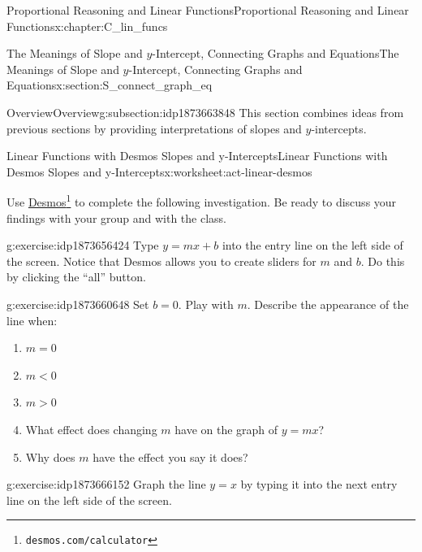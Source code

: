 \documentclass[oneside,10pt,]{book}
\numberwithin{equation}{chapter}
\newcommand{\lt}{<}
\newcommand{\gt}{>}
\begin{document}
\begin{chapterptx}{Proportional Reasoning and Linear Functions}{}{Proportional Reasoning and Linear Functions}{}{}{x:chapter:C_lin_funcs}
\begin{sectionptx}{The Meanings of Slope and \(y\)-Intercept, Connecting Graphs and Equations}{}{The Meanings of Slope and \(y\)-Intercept, Connecting Graphs and Equations}{}{}{x:section:S_connect_graph_eq}
\typeout{************************************************}
%
\begin{subsectionptx}{Overview}{}{Overview}{}{}{g:subsection:idp1873663848}
This section combines ideas from previous sections by providing interpretations of slopes and \(y\)-intercepts.%
\end{subsectionptx}
%
%
\typeout{************************************************}
\typeout{************************************************}
%
\begin{worksheet-subsection}{Linear Functions with Desmos \textemdash{} Slopes and y-Intercepts}{}{Linear Functions with Desmos \textemdash{} Slopes and y-Intercepts}{}{}{x:worksheet:act-linear-desmos}
\begin{introduction}{}%
Use \href{https://www.desmos.com/calculator}{Desmos}\footnote{\nolinkurl{desmos.com/calculator}\label{g:fn:idp1873656296}} to complete the following investigation. Be ready to discuss your findings with your group and with the class.%
\end{introduction}%
\begin{divisionexercise}{1}{}{}{g:exercise:idp1873656424}%
Type \(y = mx + b\) into the entry line on the left side of the screen. Notice that Desmos allows you to create sliders for \(m\) and \(b\). Do this by clicking the ``all'' button.%
\end{divisionexercise}%
\begin{divisionexercise}{2}{}{}{g:exercise:idp1873660648}%
Set \(b = 0\). Play with \(m\). Describe the appearance of the line when:%
\begin{enumerate}[font=\bfseries,label=(\alph*),ref=\alph*]
\item{}\(m = 0\)%
\item{}\(m \lt 0\)%
\item{}\(m \gt 0\)%
\item{}What effect does changing \(m\) have on the graph of \(y = mx\)?%
\item{}Why does \(m\) have the effect you say it does?%
\end{enumerate}
\end{divisionexercise}%
\begin{divisionexercise}{3}{}{}{g:exercise:idp1873666152}%
Graph the line \(y = x\) by typing it into the next entry line on the left side of the screen.%
\end{divisionexercise}%

\end{worksheet-subsection}
\end{sectionptx}
\end{chapterptx}
\end{document}
